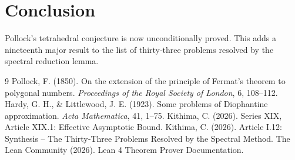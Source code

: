 \documentclass[11pt,a4paper]{article}
\begin{document}
\section{Conclusion}

Pollock's tetrahedral conjecture is now unconditionally proved. This adds a nineteenth major result to the list of thirty‑three problems resolved by the spectral reduction lemma.


\begin{thebibliography}{9}
  Pollock, F. (1850). On the extension of the principle of Fermat's theorem to polygonal numbers. \emph{Proceedings of the Royal Society of London}, 6, 108–112.
  Hardy, G. H., \& Littlewood, J. E. (1923). Some problems of Diophantine approximation. \emph{Acta Mathematica}, 41, 1–75.
  Kithima, C. (2026). Series XIX, Article XIX.1: Effective Asymptotic Bound.
  Kithima, C. (2026). Article I.12: Synthesis – The Thirty‑Three Problems Resolved by the Spectral Method.
  The Lean Community (2026). Lean 4 Theorem Prover Documentation.
\end{thebibliography}
\end{document}
